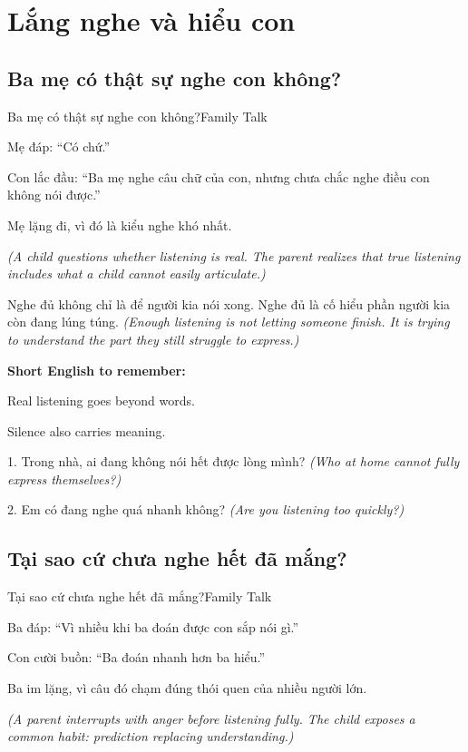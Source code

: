 \chapter{Lắng nghe và hiểu con}

\section{Ba mẹ có thật sự nghe con không?}
\begin{truyen}{Ba mẹ có thật sự nghe con không?}{Family Talk}

Mẹ đáp: ``Có chứ.''

Con lắc đầu: ``Ba mẹ nghe câu chữ của con, nhưng chưa chắc nghe điều con không nói được.''

Mẹ lặng đi, vì đó là kiểu nghe khó nhất.

\textit{(A child questions whether listening is real. The parent realizes that true listening includes what a child cannot easily articulate.)}
\end{truyen}

\begin{baihoc}
Nghe đủ không chỉ là để người kia nói xong. Nghe đủ là cố hiểu phần người kia còn đang lúng túng.
\textit{(Enough listening is not letting someone finish. It is trying to understand the part they still struggle to express.)}
\end{baihoc}

\begin{ghinhoanh}
\textbf{Short English to remember:}

Real listening goes beyond words.

Silence also carries meaning.
\end{ghinhoanh}

\begin{tuhocnhanh}
1. Trong nhà, ai đang không nói hết được lòng mình? \textit{(Who at home cannot fully express themselves?)}

2. Em có đang nghe quá nhanh không? \textit{(Are you listening too quickly?)}
\end{tuhocnhanh}
\ngancach

\section{Tại sao cứ chưa nghe hết đã mắng?}
\begin{truyen}{Tại sao cứ chưa nghe hết đã mắng?}{Family Talk}

Ba đáp: ``Vì nhiều khi ba đoán được con sắp nói gì.''

Con cười buồn: ``Ba đoán nhanh hơn ba hiểu.''

Ba im lặng, vì câu đó chạm đúng thói quen của nhiều người lớn.

\textit{(A parent interrupts with anger before listening fully. The child exposes a common habit: prediction replacing understanding.)}
\end{truyen}

